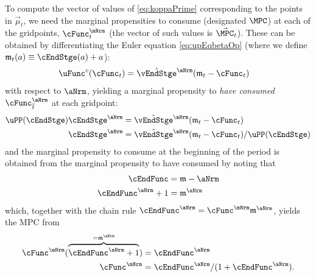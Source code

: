 \documentclass[titlepage, headings=optiontotocandhead]{\econtex}
\begin{document}
To compute the vector of values of \eqref{eq:koppaPrime} corresponding
to the points in $\vec{\mu}_{t}$, we need the marginal propensities to
consume (designated $\MPC$) at each of the gridpoints,
$\cFunc^{\mNrm}_{t}$ (the vector of such values is 
$\vec{\MPC}_{t}$).  These can be obtained by differentiating the
Euler equation \eqref{eq:upEqbetaOp} (where we define
$\mathfrak{m}_{t}({a}) \equiv \cEndStge({a})+{a}$):
\begin{equation}\begin{gathered}\begin{aligned}
      \uFunc^{{c}}({\cFunc}_{t})   & = \hat{\vEndStge}^{\aNrm}(\mathfrak{m}_{t}-{\cFunc}_{t})
    \end{aligned}\end{gathered}\end{equation}
with respect to $\aNrm$, yielding a marginal propensity to
\textit{have consumed} $\cFunc_{\overline{t}}^{\aNrm}$ at each gridpoint:
\begin{equation}\begin{gathered}\begin{aligned}
      \uPP(\cEndStge)\cEndStge^{\aNrm}  & = \hat{\vEndStge}^{\aNrm}(\mathfrak{m}_{t}-{\cFunc}_{t})
      \\ \cEndStge^{\aNrm}  & = \hat{\vEndStge}^{\aNrm}(\mathfrak{m}_{t}-{\cFunc}_{t})/\uPP(\cEndStge)
    \end{aligned}\end{gathered}\end{equation}
and the marginal propensity to consume at the beginning of the period is obtained from the marginal
propensity to have consumed by noting that
\begin{equation*}\begin{gathered}\begin{aligned}
      \cEndFunc  & = \mathfrak{m}-\aNrm
      \\ \cEndFunc^{\aNrm}+1  & = \mathfrak{m}^{\aNrm}
    \end{aligned}\end{gathered}\end{equation*}
which, together with the chain rule $\cEndFunc^{\aNrm}  = \cFunc^{\mNrm}\mathfrak{m}^{\aNrm}$,
yields the MPC from
\begin{equation}\begin{gathered}\begin{aligned}
      \cFunc^{\mNrm}(\overbrace{\cEndFunc^{\aNrm}+1}^{=\mathfrak{m}^{\aNrm}})  & = \cEndFunc^{\aNrm}
      \\ \cFunc^{\mNrm}  & = \cEndFunc^{\aNrm}/(1+\cEndFunc^{\aNrm}) \label{eq:MPCfromMPTHC}.
    \end{aligned}\end{gathered}\end{equation}
\end{document}
